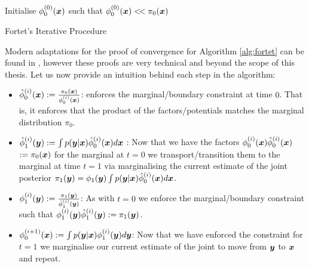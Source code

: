 \documentclass[a4paper,12pt,twoside,openright]{report}
\theoremstyle{definition}
\begin{document}
\begin{algorithm} \label{alg:fortet}
Initialise $\phi_0^{(0)}({\bm{x}})$ such that $\phi_0^{(0)}({\bm{x}}) <\!< \pi_0({\bm{x}})$ \\
\caption{Fortet's Iterative Procedure}
\end{algorithm}
Modern adaptations for the proof of convergence for Algorithm  \ref{alg:fortet} can be found in \citep{essid2019traversing, chen2016entropic}, however these proofs are very technical and beyond the scope of this thesis. Let us now provide an intuition behind each step in the algorithm:

\begin{itemize}
    \item ${\hat{\phi}}_0^{(i)}({\bm{x}}) := \frac{\pi_0({\bm{x}})}{\phi_0^{(i)}({\bm{x}})}$: enforces the marginal/boundary constraint at time $0$. That is, it enforces that the product of the factors/potentials matches the marginal distribution $\pi_0$.
    \item ${\hat{\phi}}_1^{(i)}({\bm{y}}) := \int  p({\bm{y}} | {\bm{x}}) {\hat{\phi}}_0^{(i)}({\bm{x}}) d{\bm{x}}$ : Now that we have the factors $\phi_0^{(i)}({\bm{x}}) {\hat{\phi}}_0^{(i)}({\bm{x}}) $ $:= {\pi_0({\bm{x}})}$ for the marginal at $t=0$ we transport/transition them to the marginal at time $t=1$ via marginalising the current estimate of the joint posterior $\pi_1({\bm{y}}) = \phi_1({\bm{y}}) \int p({\bm{y}}| {\bm{x}}) {\hat{\phi}}_0^{(i)}({\bm{x}}) d{\bm{x}}$.
    \item  $\phi_1^{(i)}({\bm{y}}) := \frac{\pi_1({\bm{y}})}{{\hat{\phi}}_1^{(i)}({\bm{y}})}$: As with $t=0$ we enforce the marginal/boundary  constraint such that  $\phi_1^{(i)}({\bm{y}}) {\hat{\phi}}_1^{(i)}({\bm{y}}) := {\pi_1({\bm{y}})}$. 
    \item $\phi^{(i+1)}_0({\bm{x}}) := \int  p({\bm{y}} | {\bm{x}}) \phi_1^{(i)}({\bm{y}}) d{\bm{y}}$: Now that we have enforced the constraint for $t=1$ we marginalise our current estimate of the joint to move from ${\bm{y}}$ to ${\bm{x}}$ and repeat.
\end{itemize}
\end{document}
